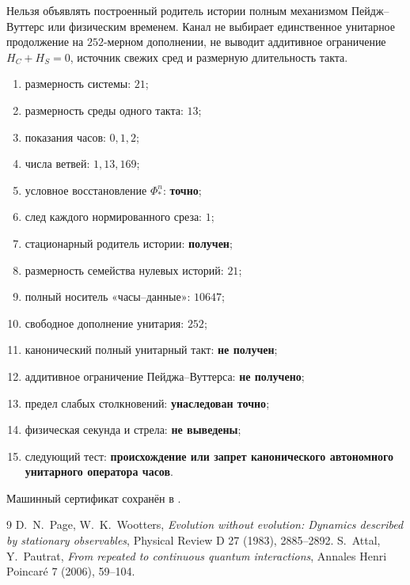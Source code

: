 \begin{nogocriterion}
Нельзя объявлять построенный родитель истории полным механизмом
Пейдж--Вуттерс или физическим временем. Канал не выбирает единственное
унитарное продолжение на $252$-мерном дополнении, не выводит аддитивное
ограничение $H_C+H_S=0$, источник свежих сред и размерную длительность
такта.
\end{nogocriterion}

\begin{protocol}
\begin{enumerate}
 \item размерность системы: \textbf{$21$};
 \item размерность среды одного такта: \textbf{$13$};
 \item показания часов: \textbf{$0,1,2$};
 \item числа ветвей: \textbf{$1,13,169$};
 \item условное восстановление $\Phi_*^n$: \textbf{точно};
 \item след каждого нормированного среза: \textbf{$1$};
 \item стационарный родитель истории: \textbf{получен};
 \item размерность семейства нулевых историй: \textbf{$21$};
 \item полный носитель «часы--данные»: \textbf{$10647$};
 \item свободное дополнение унитария: \textbf{$252$};
 \item канонический полный унитарный такт: \textbf{не получен};
 \item аддитивное ограничение Пейджа--Вуттерса: \textbf{не получено};
 \item предел слабых столкновений: \textbf{унаследован точно};
 \item физическая секунда и стрела: \textbf{не выведены};
 \item следующий тест: \textbf{происхождение или запрет канонического
 автономного унитарного оператора часов}.
\end{enumerate}
\end{protocol}

Машинный сертификат сохранён в
.

\begin{thebibliography}{9}
D.~N.~Page, W.~K.~Wootters,
\emph{Evolution without evolution: Dynamics described by stationary
observables}, Physical Review D 27 (1983), 2885--2892.
S.~Attal, Y.~Pautrat,
\emph{From repeated to continuous quantum interactions},
Annales Henri Poincar\'e 7 (2006), 59--104.
\end{thebibliography}